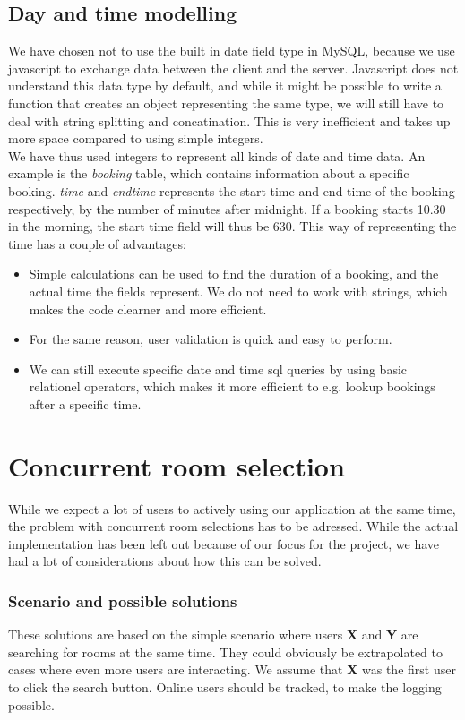 \subsection{Day and time modelling}
\label{sub:day_and_time_modelling}
We have chosen not to use the built in date field type in MySQL, because we use javascript to exchange data between the client and the server. Javascript does not understand this data type by default, and while it might be possible to write a function that creates an object representing the same type, we will still have to deal with string splitting and concatination. This is very inefficient and takes up more space compared to using simple integers.\\
We have thus used integers to represent all kinds of date and time data. An example is the \emph{booking} table, which contains information about a specific booking. \emph{time} and \emph{endtime} represents the start time and end time of the booking respectively, by the number of minutes after midnight. If a booking starts 10.30 in the morning, the start time field will thus be 630. This way of representing the time has a couple of advantages:

\begin{itemize}
	\item Simple calculations can be used to find the duration of a booking, and the actual time the fields represent. We do not need to work with strings, which makes the code clearner and more efficient.
	\item For the same reason, user validation is quick and easy to perform.
	\item We can still execute specific date and time sql queries by using basic relationel operators, which makes it more efficient to e.g. lookup bookings after a specific time.
\end{itemize}

\section{Concurrent room selection}
\label{sub:challenges_concurrent_rooms}
While we expect a lot of users to actively using our application at the same time, the problem with concurrent room selections has to be adressed. While the actual implementation has been left out because of our focus for the project, we have had a lot of considerations about how this can be solved.\\

\subsubsection*{Scenario and possible solutions}
These solutions are based on the simple scenario where users \textbf{X} and \textbf{Y} are searching for rooms at the same time. They could obviously be extrapolated to cases where even more users are interacting. We assume that \textbf{X} was the first user to click the search button. Online users should be tracked, to make the logging possible.
